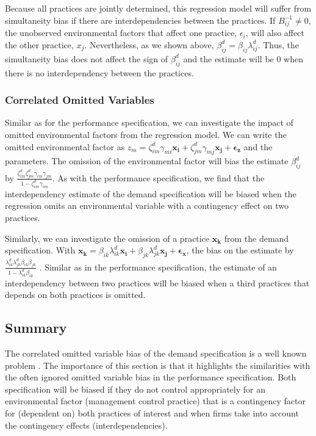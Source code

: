 \documentclass[12pt]{article}
\begin{document}
Because all practices are jointly determined, this regression model will suffer from simultaneity bias \citep{Chenhall2007} if there are interdependencies between the practices. If $B^{-1}_{ij} \neq 0$, the unobserved environmental factors that affect one practice, $\epsilon_i$, will also affect the other practice, $x_j$. Nevertheless, as we shown above, $\beta^d_{ij} = \beta_{ij} \lambda^d_{ij}$. Thus, the simultaneity bias does not affect the sign of $\beta^d_{ij}$ and the estimate will be 0 when there is no interdependency between the practices. 

\subsubsection{Correlated Omitted Variables}

Similar as for the performance specification, we can investigate the impact of omitted environmental factors from the regression model. We can write the omitted environmental factor as $z_m = \zeta_{im}^d \gamma_{mi} \mathbf{x_i} +  \zeta_{jm}^d \gamma_{mj} \mathbf{x_j} + \mathbf{\epsilon_z}$ and the parameters. The omission of the environmental factor will bias the estimate $\beta^d_{ij}$ by $\frac{\zeta^d_{im} \zeta^d_ {jm}\gamma_{im} \gamma_{jm}}{1 - \zeta^d_{im} \gamma_{im}}$. As with the performance specification, we find that the interdependency estimate of the demand specification will be biased when the regression omits an environmental variable with a contingency effect on two practices.

Similarly, we can investigate the omission of a practice $\mathbf{x_k}$ from the demand specification. With $\mathbf{x_k} = \beta_{ik} \lambda^d_{ik} \mathbf{x_i} + \beta_{jk} \lambda^d_{jk} \mathbf{x_j} + \mathbf{\epsilon_x}$, the bias on the estimate by $\frac{\lambda^d_{ik} \lambda^d_{jk} \beta_{ik} \beta_{jk}}{1 - \lambda^d_{ik} \beta_{ik}}$ . Similar as in the performance specification, the estimate of an interdependency between two practices will be biased when a third practices that depends on both practices is omitted. 

\subsection{Summary}

The correlated omitted variable bias of the demand specification is a well known problem \citep{Grabner2013,Arora1996,Carree2011}. The importance of this section is that it highlights the similarities with the often ignored omitted variable bias in the performance specification. Both specification will be biased if they do not control appropriately for an environmental factor (management control practice) that is a contingency factor for (dependent on) both practices of interest and when firms take into account the contingency effects (interdependencies).
\end{document}
